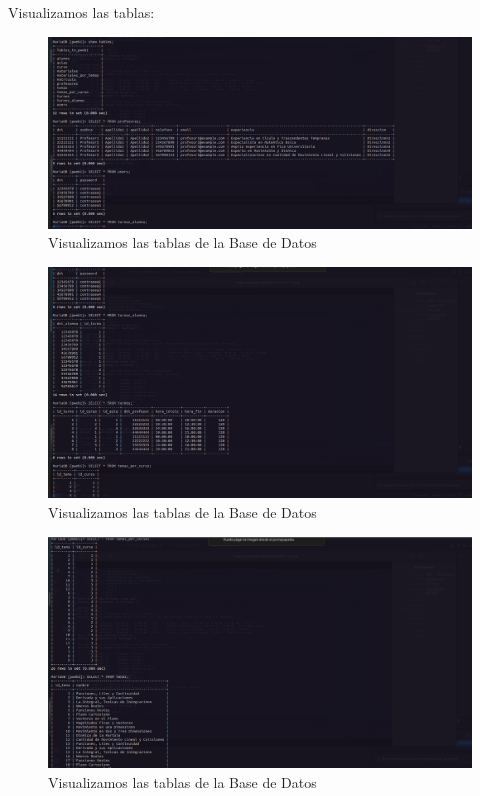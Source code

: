 Visualizamos las tablas:
\begin{figure}[H]
  \centering
  \includegraphics[width=1.0\textwidth]{img/Viendo_Datos_6.png}
  \caption{Visualizamos las tablas de la Base de Datos}
\end{figure}
\begin{figure}[H]
  \centering
  \includegraphics[width=1.0\textwidth]{img/Viendo_Datos_5.png}
  \caption{Visualizamos las tablas de la Base de Datos}
\end{figure}
\begin{figure}[H]
  \centering
  \includegraphics[width=1.0\textwidth]{img/Viendo_Datos_4.png}
  \caption{Visualizamos las tablas de la Base de Datos}
\end{figure}
